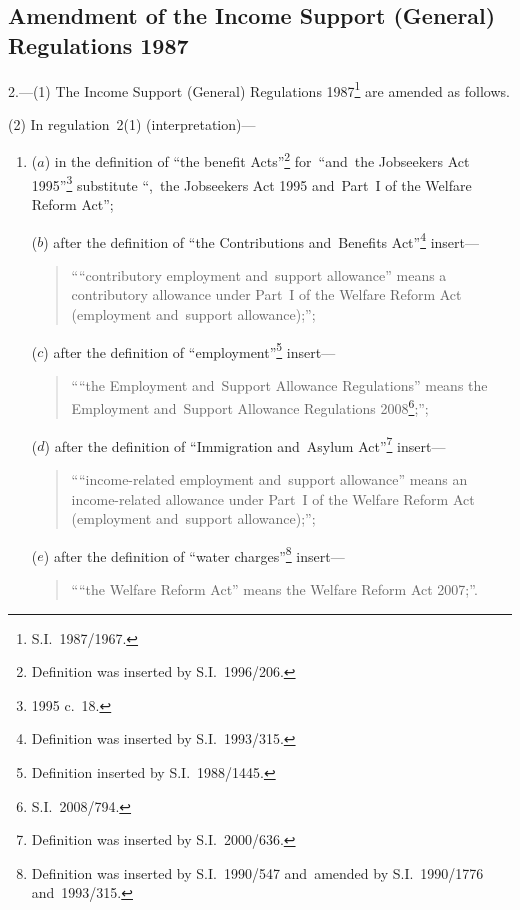 \documentclass[12pt,a4paper]{article}
\begin{document}
\renewcommand\parthead{--- Part II}

\subsection[2. Amendment of the Income Support (General) Regulations 1987]{Amendment of the Income Support (General) Regulations 1987}

2.---(1)  The Income Support (General) Regulations 1987\footnote{S.I.~1987/1967.} are amended as follows.

(2) In regulation~2(1) (interpretation)—
\begin{enumerate}\item[]
($a$) in the definition of “the benefit Acts”\footnote{Definition was inserted by S.I.~1996/206.} for~“and~the Jobseekers Act 1995”\footnote{1995 c.~18.} substitute “,~the Jobseekers Act 1995 and~Part~I of the Welfare Reform Act”;

($b$) after the definition of “the Contributions and~Benefits Act”\footnote{Definition was inserted by S.I.~1993/315.} insert—
\begin{quotation}
““contributory employment and~support allowance” means a contributory allowance under Part~I of the Welfare Reform Act (employment and~support allowance);”;
\end{quotation}

($c$) after the definition of “employment”\footnote{Definition inserted by S.I.~1988/1445.} insert—
\begin{quotation}
““the Employment and~Support Allowance Regulations” means the Employment and~Support Allowance Regulations 2008\footnote{S.I.~2008/794.};”;
\end{quotation}

($d$) after the definition of “Immigration and~Asylum Act”\footnote{Definition was inserted by S.I.~2000/636.} insert—
\begin{quotation}\sloppy
““income-related employment and~support allowance” means an income-related allowance under Part~I of the Welfare Reform Act (employment and~support allowance);”;
\end{quotation}

($e$) after the definition of “water charges”\footnote{Definition was inserted by S.I.~1990/547 and~amended by S.I.~1990/1776 and~1993/315.} insert—
\begin{quotation}
““the Welfare Reform Act” means the Welfare Reform Act 2007;”.
\end{quotation}
\end{enumerate}
\end{document}
